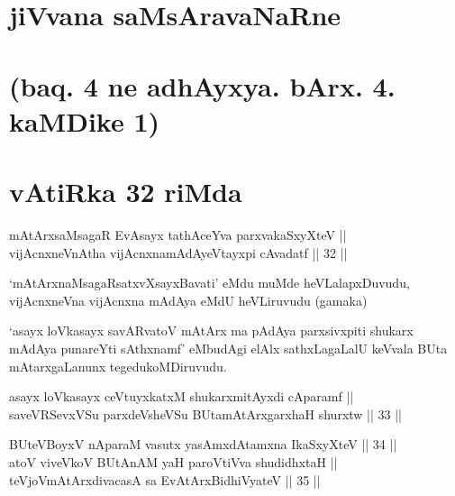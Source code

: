 \section*{jiVvana saMsAravaNaRne}

\section*{(baq. 4 ne adhAyxya. bArx. 4. kaMDike 1)}

\section*{vAtiRka 32 riMda \mdash  }


\begin{shl}
\footnotemark[1]mAtArxsaMsagaR EvAsayx tathAceYva parxvakaSxyXteV || \\
vijAcnxneVnAtha vijAcnxnamAdAyeVtayxpi cAvadatf \hfill || 32 || 
\end{shl}

\begin{artha}
`mAtArx\s naMsagaRsatxvXsayxBavati' eMdu muMde
heVLalapxDuvudu, vijAcnxneVna vijAcnxna mAdAya eMdU heVLiruvudu
(gamaka)
\end{artha}

\begin{artha}
`asayx loVkasayx savARvatoV mAtArx ma pAdAya parxsivxpiti shukarx mAdAya punareYti sAthxnamf' eMbudAgi elAlx sathxLagaLalU keVvala BUta mAtarxgaLanunx
tegedukoMDiruvudu.
\end{artha}

\begin{shl}
asayx loVkasayx ceVtuyxkatxM shukarxmitAyxdi cAparamf || \\
saveVRSevxVSu parxdeVsheVSu BUtamAtArxgarxhaH shurxtw \hfill || 33 ||  
\end{shl}

\begin{shl}
\footnotemark[2]BUteVBoyxV nAparaM vasutx yasAmxdAtamxna IkaSxyXteV \hfill || 34 || \\
atoV viveVkoV BUtAnAM yaH paroV\s tiVva shudidhxtaH || \\
teVjoVmAtArxdivacasA sa EvAtArxBidhiVyateV \hfill || 35 ||  
\end{shl}

